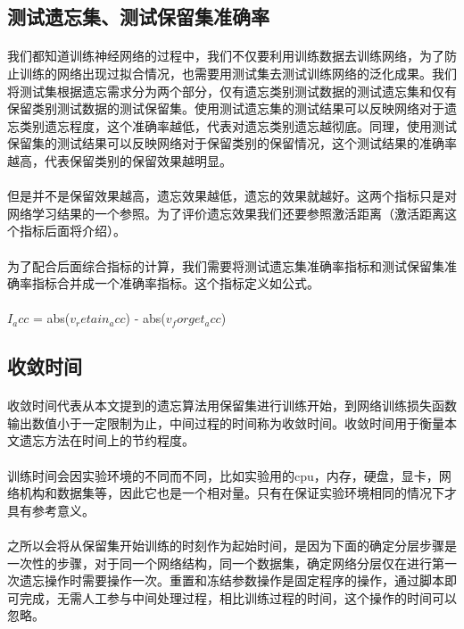 \subsection{测试遗忘集、测试保留集准确率}
\paragraph{}我们都知道训练神经网络的过程中，我们不仅要利用训练数据去训练网络，为了防止训练的网络出现过拟合情况，也需要用测试集去测试训练网络的泛化成果。我们将测试集根据遗忘需求分为两个部分，仅有遗忘类别测试数据的测试遗忘集和仅有保留类别测试数据的测试保留集。使用测试遗忘集的测试结果可以反映网络对于遗忘类别遗忘程度，这个准确率越低，代表对遗忘类别遗忘越彻底。同理，使用测试保留集的测试结果可以反映网络对于保留类别的保留情况，这个测试结果的准确率越高，代表保留类别的保留效果越明显。
\paragraph{}但是并不是保留效果越高，遗忘效果越低，遗忘的效果就越好。这两个指标只是对网络学习结果的一个参照。为了评价遗忘效果我们还要参照激活距离（激活距离这个指标后面将介绍）。
\paragraph{}为了配合后面综合指标的计算，我们需要将测试遗忘集准确率指标和测试保留集准确率指标合并成一个准确率指标。这个指标定义如公式。
\paragraph{}$I_acc$ = abs($v_retain_acc$) - abs($v_forget_acc$)
\subsection{收敛时间}
\paragraph{}收敛时间代表从本文提到的遗忘算法用保留集进行训练开始，到网络训练损失函数输出数值小于一定限制为止，中间过程的时间称为收敛时间。收敛时间用于衡量本文遗忘方法在时间上的节约程度。
\paragraph{}训练时间会因实验环境的不同而不同，比如实验用的cpu，内存，硬盘，显卡，网络机构和数据集等，因此它也是一个相对量。只有在保证实验环境相同的情况下才具有参考意义。
\paragraph{}之所以会将从保留集开始训练的时刻作为起始时间，是因为下面的确定分层步骤是一次性的步骤，对于同一个网络结构，同一个数据集，确定网络分层仅在进行第一次遗忘操作时需要操作一次。重置和冻结参数操作是固定程序的操作，通过脚本即可完成，无需人工参与中间处理过程，相比训练过程的时间，这个操作的时间可以忽略。
